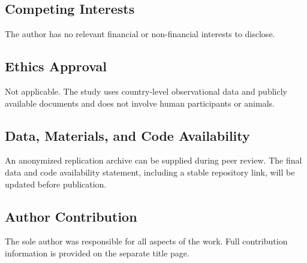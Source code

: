 \documentclass[referee,pdflatex,sn-basic]{sn-jnl}
\theoremstyle{thmstylethree}
\begin{document}
\subsection*{Competing Interests}\label{competing-interests}

The author has no relevant financial or non-financial interests to disclose.

\subsection*{Ethics Approval}\label{ethics-approval}

Not applicable. The study uses country-level observational data and publicly available documents and does not involve human participants or animals.

\subsection*{Data, Materials, and Code Availability}\label{data-materials-and-code-availability}

An anonymized replication archive can be supplied during peer review. The final data and code availability statement, including a stable repository link, will be updated before publication.

\subsection*{Author Contribution}\label{author-contribution}

The sole author was responsible for all aspects of the work. Full contribution information is provided on the separate title page.

\clearpage



\clearpage
\end{document}

